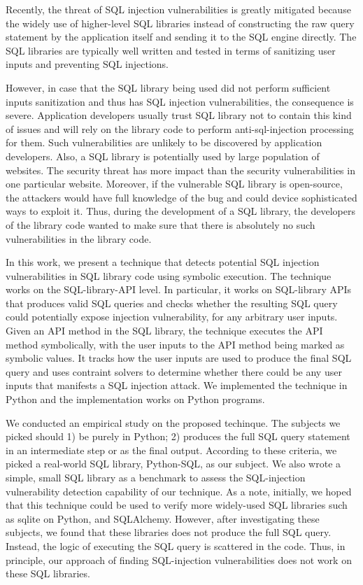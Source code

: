 \documentclass[conference]{IEEEtran}
\begin{document}
Recently, the threat of SQL injection vulnerabilities is greatly mitigated because the widely use of higher-level SQL libraries instead of constructing the raw query statement by the application itself and sending it to the SQL engine directly. The SQL libraries are typically well written and tested in terms of sanitizing user inputs and preventing SQL injections. 

However, in case that the SQL library being used did not perform sufficient inputs sanitization and thus has SQL injection vulnerabilities, the consequence is severe. Application developers usually trust SQL library not to contain this kind of issues and will rely on the library code to perform anti-sql-injection processing for them. Such vulnerabilities are unlikely to be discovered by application developers. Also, a SQL library is potentially used by large population of websites. The security threat has more impact than the security vulnerabilities in one particular website. Moreover, if the vulnerable SQL library is open-source, the attackers would have full knowledge of the bug and could device sophisticated ways to exploit it. Thus, during the development of a SQL library, the developers of the library code wanted to make sure that there is absolutely no such vulnerabilities in the library code.

In this work, we present a technique that detects potential SQL injection vulnerabilities in SQL library code using symbolic execution. The technique works on the SQL-library-API level. In particular, it works on SQL-library APIs that produces valid SQL queries and checks whether the resulting SQL query could potentially expose injection vulnerability, for any arbitrary user inputs. Given an API method in the SQL library, the technique executes the API method symbolically, with the user inputs to the API method being marked as symbolic values. It tracks how the user inputs are used to produce the final SQL query and uses contraint solvers to determine whether there could be any user inputs that manifests a SQL injection attack. We implemented the technique in Python and the implementation works on Python programs.

We conducted an empirical study on the proposed techinque. The subjects we picked should 1) be purely in Python; 2) produces the full SQL query statement in an intermediate step or as the final output. According to these criteria, we picked a real-world SQL library, Python-SQL, as our subject. We also wrote a simple, small SQL library as a benchmark to assess the SQL-injection vulnerability detection capability of our technique.
As a note, initially, we hoped that this technique could be used to verify more widely-used SQL libraries such as sqlite on Python, and SQLAlchemy. However, after investigating these subjects, we found that these libraries does not produce the full SQL query. Instead, the logic of executing the SQL query is scattered in the code. Thus, in principle, our approach of finding SQL-injection vulnerabilities does not work on these SQL libraries.
\end{document}
